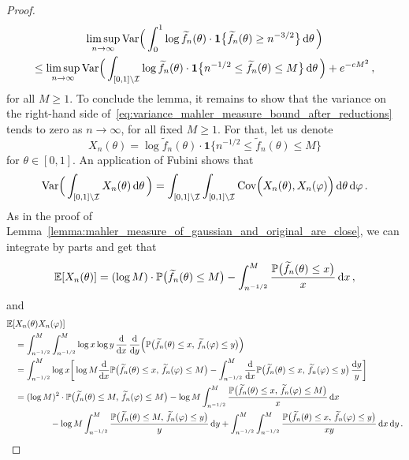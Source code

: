 \documentclass[11pt]{amsart}
\theoremstyle{remark}
\theoremstyle{definition}
\newcommand{\bP}{\mathbb P}
\newcommand{\bE}{\mathbb E}
\newcommand{\one}{\boldsymbol{1}}
\begin{document}
\begin{proof}
\begin{multline}
            \limsup_{n\to \infty} \text{\normalfont Var}\Big( \int_{0}^1 \log \widetilde{f}_n(\theta) \cdot  \one\big\{ \widetilde f_n(\theta) \ge n^{-3/2}\big\} \, {\rm d}\theta \, \Big)  \\ \le  \limsup_{n\to \infty} \text{\normalfont Var}\Big( \int_{[0,1]\setminus \mathcal{I}} \log \widetilde{f}_n(\theta) \cdot  \one\big\{ n^{-1/2} \le  \widetilde f_n(\theta) \le M\big\} \, {\rm d}\theta \, \Big) + e^{-cM^2} \, ,
        \end{multline}
        for all $M\ge 1$. To conclude the lemma, it remains to show that the variance on the right-hand side of~\eqref{eq:variance_mahler_measure_bound_after_reductions} tends to zero as $n\to\infty$, for all fixed $M\ge 1$. For that, let us denote 
        \[
        X_n(\theta) = \log \widetilde{f}_n(\theta) \cdot  \one\big\{ n^{-1/2} \le  \widetilde f_n(\theta) \le M\big\} 
        \]
        for $\theta\in[0,1]$. An application of Fubini shows that
        \begin{equation}
        \label{eq:variance_of_mahler_measure_after_reductions_and_fubini}
            \text{Var}\Big( \int_{[0,1]\setminus \mathcal{I}} X_n(\theta) \, {\rm d}\theta \, \Big) = \int_{[0,1]\setminus \mathcal{I}} \int_{[0,1]\setminus \mathcal{I}} \text{Cov}\Big(X_n(\theta) ,X_n(\varphi)\Big) \, {\rm d}\theta \, {\rm d}\varphi \, .
        \end{equation}
        As in the proof of Lemma~\ref{lemma:mahler_measure_of_gaussian_and_original_are_close}, we can integrate by parts and get that 
        \[
        \bE[X_n(\theta)] = (\log M)  \cdot \bP\big(\widetilde f_n(\theta) \le M\big) - \int_{n^{-1/2}}^{M}  \frac{\bP\big(\widetilde f_n(\theta) \le x\big)}{x}\, {\rm d}x \, ,
        \]
        and 
        \begin{align*}
            \bE[&X_n(\theta) X_n(\varphi)] \\ &= \int_{n^{-1/2}}^{M}\int_{n^{-1/2}}^{M} \log x \log y \, \frac{{\rm d}}{{\rm d} x} \, \frac{{\rm d}}{{\rm d} y}\Big( \bP\big(\widetilde f_n(\theta) \le x, \, \widetilde f_n(\varphi) \le y \big) \Big)  \\ &= \int_{n^{-1/2}}^{M} \log x \bigg[\log M \frac{{\rm d}}{{\rm d} x} \bP\big(\widetilde f_n(\theta) \le x, \, \widetilde f_n(\varphi) \le M \big) - \int_{n^{-1/2}}^{M} \frac{{\rm d}}{{\rm d} x} \bP\big(\widetilde f_n(\theta) \le x, \, \widetilde f_n(\varphi) \le y \big) \, \frac{{\rm d}y}{y} \bigg] \\ &= (\log M)^2 \cdot \bP\big(\widetilde f_n(\theta) \le M, \, \widetilde f_n(\varphi) \le M \big) - \log M \int_{n^{-1/2}}^M \frac{\bP\big(\widetilde f_n(\theta) \le x, \, \widetilde f_n(\varphi) \le M \big)}{x} \,  {{\rm d}x} \\ & \qquad \qquad  - \log M \int_{n^{-1/2}}^M \frac{\bP\big(\widetilde f_n(\theta) \le M, \, \widetilde f_n(\varphi) \le y \big)}{y} \,  {{\rm d}y} + \int_{n^{-1/2}}^M\int_{n^{-1/2}}^M \frac{\bP\big(\widetilde f_n(\theta) \le x, \, \widetilde f_n(\varphi) \le y \big)}{xy} \, {\rm d}x \, {\rm d}y \, .

\end{align*}
\end{proof}
\end{document}
